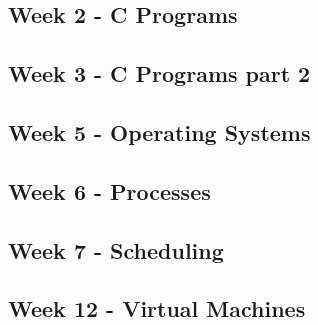 
\subsection*{Week 2 - C Programs}



\subsection*{Week 3 - C Programs part 2}



\subsection*{Week 5 - Operating Systems}



\subsection*{Week 6 - Processes}



\subsection*{Week 7 - Scheduling}



\subsection*{Week 12 - Virtual Machines}

